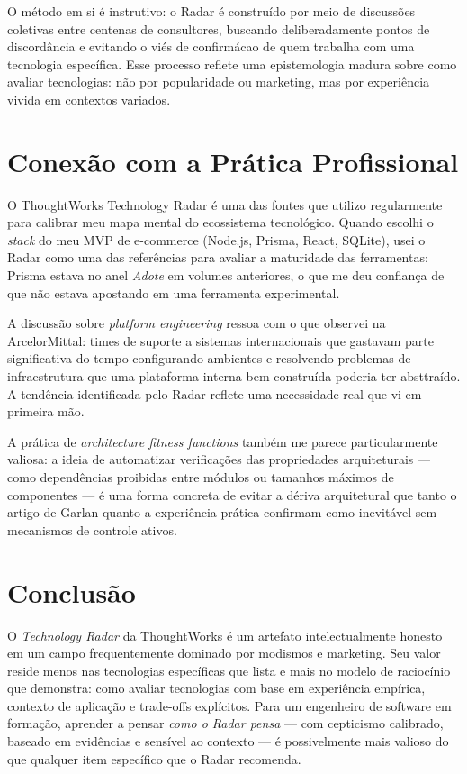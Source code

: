 \documentclass[12pt,a4paper]{article}
\begin{document}
O m\'etodo em si \'e instrutivo: o Radar \'e constru\'ido por meio de discuss\~oes
coletivas entre centenas de consultores, buscando deliberadamente pontos de
discord\^ancia e evitando o vi\'es de confirm\'acao de quem trabalha com uma
tecnologia espec\'ifica. Esse processo reflete uma epistemologia madura sobre como
avaliar tecnologias: n\~ao por popularidade ou marketing, mas por experi\^encia
vivida em contextos variados.

\section{Conex\~ao com a Pr\'atica Profissional}

O ThoughtWorks Technology Radar \'e uma das fontes que utilizo regularmente para
calibrar meu mapa mental do ecossistema tecnol\'ogico. Quando escolhi o \textit{stack}
do meu MVP de e-commerce (Node.js, Prisma, React, SQLite), usei o Radar como uma
das refer\^encias para avaliar a maturidade das ferramentas: Prisma estava no anel
\textit{Adote} em volumes anteriores, o que me deu confian\c{c}a de que n\~ao estava
apostando em uma ferramenta experimental.

A discuss\~ao sobre \textit{platform engineering} ressoa com o que observei na
ArcelorMittal: times de suporte a sistemas internacionais que gastavam parte
significativa do tempo configurando ambientes e resolvendo problemas de infraestrutura
que uma plataforma interna bem constru\'ida poderia ter absttra\'ido. A tend\^encia
identificada pelo Radar reflete uma necessidade real que vi em primeira m\~ao.

A pr\'atica de \textit{architecture fitness functions} tamb\'em me parece
particularmente valiosa: a ideia de automatizar verifica\c{c}\~oes das propriedades
arquiteturais --- como depend\^encias proibidas entre m\'odulos ou tamanhos m\'aximos
de componentes --- \'e uma forma concreta de evitar a d\'eriva arquitetural que
tanto o artigo de Garlan quanto a experi\^encia pr\'atica confirmam como inevit\'avel
sem mecanismos de controle ativos.

\section{Conclus\~ao}

O \textit{Technology Radar} da ThoughtWorks \'e um artefato intelectualmente
honesto em um campo frequentemente dominado por modismos e marketing. Seu valor
reside menos nas tecnologias espec\'ificas que lista e mais no modelo de racioc\'inio
que demonstra: como avaliar tecnologias com base em experi\^encia emp\'irica,
contexto de aplica\c{c}\~ao e trade-offs expl\'icitos. Para um engenheiro de
software em forma\c{c}\~ao, aprender a pensar \textit{como o Radar pensa} --- com
cepticismo calibrado, baseado em evid\^encias e sens\'ivel ao contexto --- \'e
possivelmente mais valioso do que qualquer item espec\'ifico que o Radar recomenda.
\end{document}

